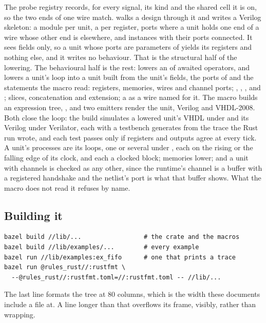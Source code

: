 The probe registry records, for every signal, its kind and the shared
cell it is on, so the two ends of one wire match. 
walks a design through it and writes a Verilog skeleton: a module per
unit, a  per register, ports where a unit holds one end of
a wire whose other end is elsewhere, and instances with their ports
connected. It sees fields only, so a unit whose ports are parameters
of  yields its registers and nothing else, and it writes no
behaviour. That is the structural half of the lowering. The
behavioural half is the rest: \code{\#[pipeline]} lowers an
 of awaited operators, and \code{\#[lower]} lowers a
unit's  loop into a  unit built from the
unit's fields, the ports of  and the statements the macro
read: registers, memories, wires and channel ports; ,
, ,  and ; slices,
concatenation and
extension; a  as a wire named for it. The macro builds an
expression tree, , and two emitters render the
unit, Verilog and VHDL-2008. Both close the loop: the build simulates
a lowered unit's VHDL under  and its Verilog under
Verilator, each with a testbench  generates from
the trace the Rust run wrote, and each test passes only if registers
and outputs agree at every tick.
A unit's processes are its loops, one or several under
, each on the rising or the falling edge of its clock,
and each a clocked block; memories lower; and a unit with channels
is checked as any other, since the runtime's channel is a buffer
with a registered handshake and the netlist's port is what that
buffer shows. What the macro does not read it refuses by name.

\subsection{Building it}

\begin{lstlisting}[style=ascii,caption={The runtime and everything written against it, built hermetically.},label={lst:r-build}]
bazel build //lib/...                 # the crate and the macros
bazel build //lib/examples/...        # every example
bazel run //lib/examples:ex_fifo      # one that prints a trace
bazel run @rules_rust//:rustfmt \
  --@rules_rust//:rustfmt.toml=//:rustfmt.toml -- //lib/...
\end{lstlisting}

The last line formats the tree at 80 columns, which is the width these
documents include a file at. A line longer than that overflows its
frame, visibly, rather than wrapping.
